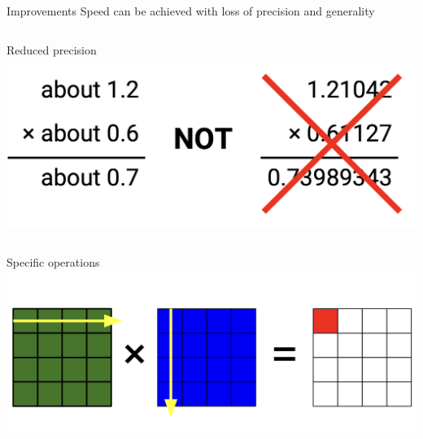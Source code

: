 \documentclass[UTF8]{beamer}
\begin{document}
\begin{frame}{Improvements}
  Speed can be achieved with loss of precision and generality
  
  \begin{columns}
    \centering Reduced precision
    \centering \includegraphics[height=4\baselineskip]{figure/reduced_prediction.png}
  \end{columns}

  \begin{columns}
    \centering Specific operations
    \centering \includegraphics[height=4\baselineskip]{figure/conv_oper.png}
  \end{columns}
\end{frame}
\end{document}
